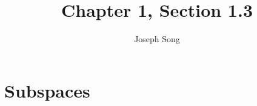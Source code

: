 \documentclass{article}
\title{Chapter 1, Section 1.3}
\author{Joseph Song}
\begin{document}
\maketitle

\section{Subspaces}
\end{document}
